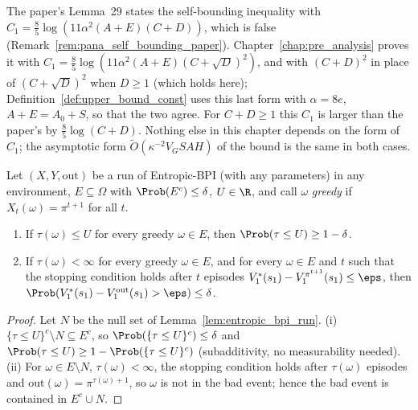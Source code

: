 \begin{remark}\label{rem:pos_c1_constant}
The paper's Lemma~29 states the self-bounding inequality with
$C_1 = \frac85\log(11\alpha^2(A + E)(C + D))$, which is false
(Remark~\ref{rem:pana_self_bounding_paper}). Chapter~\ref{chap:pre_analysis} proves it with
$C_1 = \frac85\log(11\alpha^2(A + E)(C + \sqrt D)^2)$, and with $(C + D)^2$ in place of
$(C + \sqrt D)^2$ when $D \ge 1$ (which holds here); Definition~\ref{def:upper_bound_const}
uses this last form with $\alpha = 8e$, $A + E = A_0 + S$, so that the two agree. For
$C + D \ge 1$ this $C_1$ is larger than the paper's by $\frac85\log(C + D)$. Nothing else in
this chapter depends on the form of $C_1$; the asymptotic form $\tilde O(\kappa^{-2}V_GSAH)$ of
the bound is the same in both cases.
\end{remark}

\begin{lemma}\label{lem:pos_core_pac}
\leanok
{}
Let $(X, Y, \mathrm{out})$ be a run of Entropic-BPI (with any parameters) in any environment, $E \subseteq \Omega$ with
$\Prob(E^c) \le \delta$, $U \in \R$, and call $\omega$ \emph{greedy} if $X_t(\omega) = \pi^{t+1}$ for all $t$.
\begin{enumerate}
  \item[(i)] If $\tau(\omega) \le U$ for every greedy $\omega \in E$, then $\Prob(\tau \le U) \ge 1 - \delta$.
  \item[(ii)] If $\tau(\omega) < \infty$ for every greedy $\omega \in E$, and for every $\omega \in E$ and $t$ such that the
  stopping condition holds after $t$ episodes $V^*_1(s_1) - V^{\pi^{t+1}}_1(s_1) \le \eps$, then
  $\Prob(V^*_1(s_1) - V^{\mathrm{out}}_1(s_1) > \eps) \le \delta$.
\end{enumerate}
\end{lemma}

\begin{proof}
\leanok
Let $N$ be the null set of Lemma~\ref{lem:entropic_bpi_run}. (i) $\{\tau \le U\}^c \setminus N \subseteq E^c$, so
$\Prob(\{\tau \le U\}^c) \le \delta$ and $\Prob(\tau \le U) \ge 1 - \Prob(\{\tau \le U\}^c)$ (subadditivity, no
measurability needed). (ii) For $\omega \in E \setminus N$, $\tau(\omega) < \infty$, the stopping condition holds after
$\tau(\omega)$ episodes and $\mathrm{out}(\omega) = \pi^{\tau(\omega)+1}$, so $\omega$ is not in the bad event; hence the bad
event is contained in $E^c \cup N$.
\end{proof}

